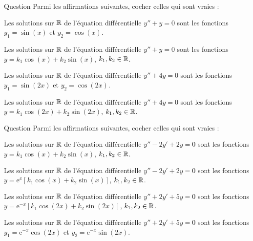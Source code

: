 \begin{multi}[multiple,feedback=
{Les solutions de l'équation caractéristique \(r^2+1=0\) sont \(\pm \mathrm{i}\). Donc la solution générale de \(y''+y=0\) est \(y=k_1\cos (x)+k_2\sin (x)\), \(k_1,k_2\in \Rr\).
\vskip0mm
Les solutions de l'équation caractéristique \(r^2+4=0\) sont \(\pm 2\mathrm{i}\). Donc la solution générale de \(y''+4y=0\) est \(y=k_1\cos (2x)+k_2\sin (2x)\), \(k_1,k_2\in \Rr\).
}]{Question}
Parmi les affirmations suivantes, cocher celles qui sont vraies :

    \item Les solutions sur \(\mathbb{R}\) de l'équation différentielle \(y''+y=0\) sont les fonctions \(\displaystyle y_1=\sin (x)\) et \(y_2=\cos (x)\).
    \item* Les solutions sur \(\mathbb{R}\) de l'équation différentielle \(y''+y=0\) sont les fonctions \(\displaystyle y=k_1\cos (x)+k_2\sin (x)\), \(k_1,k_2\in \Rr\).
    \item Les solutions sur \(\mathbb{R}\) de l'équation différentielle \(y''+4y=0\) sont les fonctions \(\displaystyle y_1=\sin (2x)\) et \(y_2=\cos (2x)\).
    \item* Les solutions sur \(\mathbb{R}\) de l'équation différentielle \(y''+4y=0\) sont les fonctions \(\displaystyle y=k_1\cos (2x)+k_2\sin (2x)\), \(k_1,k_2\in \Rr\).
\end{multi}


\begin{multi}{Question}
Parmi les affirmations suivantes, cocher celles qui sont vraies :

    \item Les solutions sur \(\mathbb{R}\) de l'équation différentielle \(y''-2y'+2y=0\) sont les fonctions \(\displaystyle y=k_1\cos (x)+k_2\sin (x)\), \(k_1,k_2\in \Rr\).
    \item* Les solutions sur \(\mathbb{R}\) de l'équation différentielle \(y''-2y'+2y=0\) sont les fonctions \(\displaystyle y=\mathrm{e}^{x}[k_1\cos (x)+k_2\sin (x)]\), \(k_1,k_2\in \Rr\).
    \item* Les solutions sur \(\mathbb{R}\) de l'équation différentielle \(y''+2y'+5y=0\) sont les fonctions \(\displaystyle y=\mathrm{e}^{-x}[k_1\cos (2x)+k_2\sin (2x)]\), \(k_1,k_2\in \Rr\).
    \item Les solutions sur \(\mathbb{R}\) de l'équation différentielle \(y''+2y'+5y=0\) sont les fonctions \(\displaystyle y_1=\mathrm{e}^{-x}\cos ( 2x)\) et \(y_2=\mathrm{e}^{-x}\sin (2x)\).
\end{multi}



